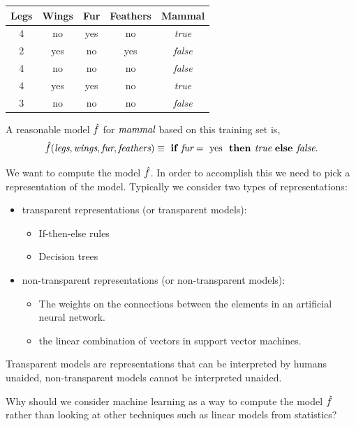 \documentclass[a4paper,blends,pdf,colorBG,slideColor]{prosper}
\begin{document}
\begin{center}
{\small
   \begin{tabular}{ccccc}
      \toprule
        Legs & Wings & Fur & Feathers&Mammal\\
      \midrule
     4 & no & yes & no& {\it true} \\
      2 & yes & no & yes & {\it false}\\
      4 & no & no & no & {\it false}\\
     4 & yes & yes & no & {\it true}\\
     3 & no & no & no &{\it false}\\
      \bottomrule
   \end{tabular}
}
\end{center}
A reasonable model $\hat{f}$ for $\text{\it mammal}$ based on this training set is,
\begin{equation*}
\hat{f}(\text{\it legs}, \text{\it wings}, \text{\it fur},\text{\it feathers}) \equiv \text{ \bf if } \text{\it fur} = \text{ yes } \text{ \bf then } \text{\it true} \text{ \bf else } \text{\it false}.
\end{equation*}
\es

We want to compute the model $\hat{f}$. In order to accomplish this we need
to pick a representation of the model.  Typically we consider
two types of representations:
\begin{itemize}
\item transparent representations (or transparent models):
\begin{itemize}
\item If-then-else rules
\item Decision trees
\end{itemize}
\item non-transparent representations (or non-transparent models):
\begin{itemize}
\item The weights on the connections between the elements in an 
artificial neural network.
\item the linear combination of vectors in support vector machines.
\end{itemize}
\end{itemize}

Transparent models are representations that can be interpreted by humans unaided,
non-transparent models cannot be interpreted unaided.  
\es

Why should we consider machine learning as a way to compute the  model $\hat{f}$
rather than looking at other techniques such as linear models from statistics?
\end{document}
